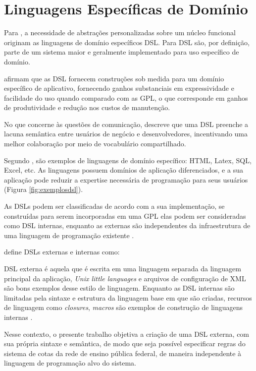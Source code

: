 \section{Linguagens Específicas de Domínio}
\label{sec:dsl}

Para , a necessidade de abstrações personalizadas sobre um núcleo funcional originam as linguagens de domínio específicos \gls{DSL}. Para  \gls{DSL} são, por definição, parte de um sistema maior e geralmente implementado para uso específico de domínio.

 afirmam que as \gls{DSL} fornecem construções sob medida para um domínio específico de aplicativo, fornecendo ganhos substanciais em expressividade e facilidade do uso quando comparado com as \gls{GPL}, o que corresponde em ganhos de produtividade e redução nos custos de manutenção.

No que concerne às questões de comunicação,  descreve que uma \gls{DSL} preenche a lacuna semântica entre usuários de negócio e desenvolvedores, incentivando uma melhor colaboração por meio de vocabulário compartilhado.  

Segundo , são exemplos de linguagens de domínio específico: HTML, Latex, SQL, Excel, etc. As linguagens possuem domínios de aplicação diferenciados, e a sua aplicação pode reduzir a expertise necessária de programação para seus usuários (Figura \ref{fig:exemplosdsl}).




As \gls{DSL}s podem ser classificadas de acordo com a sua implementação, se construídas para serem incorporadas em uma \gls{GPL} elas podem ser consideradas como \gls{DSL} internas, enquanto as externas são independentes da infraestrutura de uma linguagem de programação existente \cite{dslengineering}.

 define \gls{DSL}s externas e internas como:

\begin{citacao} 
\gls{DSL} externa é aquela que é escrita em uma linguagem separada da linguagem principal da aplicação, \textit{Unix little languages} e arquivos de configuração de \gls{XML} são bons exemplos desse estilo de linguagem. Enquanto as \gls{DSL} internas são limitadas pela sintaxe e estrutura da linguagem base em que são criadas, recursos de linguagem como \textit{closures}, \textit{macros} são exemplos de construção de linguagens internas \cite{fowler2005language}.
\end{citacao}


Nesse contexto, o presente trabalho objetiva a criação de uma \gls{DSL} externa, com sua própria sintaxe e semântica, de modo que seja possível especificar regras do sistema de cotas da rede de ensino pública federal, de maneira independente à linguagem de programação alvo do sistema. 



